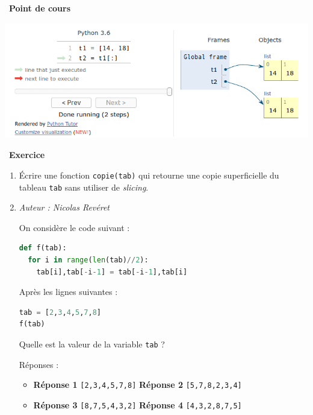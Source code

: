 \documentclass[
  11pt,
]{article}
\newcommand{\passthrough}[1]{#1}
\providecommand{\tightlist}{%
  \setlength{\itemsep}{0pt}\setlength{\parskip}{0pt}}
\newcounter{exo}
\newenvironment{exercice}[1]
{\par \medskip   \addtocounter{exo}{1} \noindent  
\begin{bclogo}[arrondi =0.1,   noborder = true, logo=\bccrayon, marge=4]{~\textbf{Exercice} \textbf{\theexo} {\itshape #1} }  \par}
{
\end{bclogo}
 \par \bigskip }
\newcounter{def}
\newcounter{cours}
\newenvironment{cours}[1]
{\par \medskip   \addtocounter{cours}{1} \noindent  
\begin{bclogo}[arrondi =0.1,  ombre = true, barre=none, logo=\bcbook, marge=4]{~\textbf{Point de cours} \textbf{\thecours} {\itshape #1} }  \par}
{
\end{bclogo}
 \par \bigskip }
\begin{document}
\begin{cours}{}
\begin{itemize}
  \includegraphics{images/shallow-copy.png}\\
\end{itemize}

\end{cours}

\begin{exercice}{}

\begin{enumerate}
\def\labelenumi{\arabic{enumi}.}
\item
  Écrire une fonction \passthrough{\lstinline!copie(tab)!} qui retourne
  une copie superficielle du tableau \passthrough{\lstinline!tab!} sans
  utiliser de \emph{slicing}.
\item
  \emph{Auteur : Nicolas Revéret}

  On considère le code suivant :

\begin{lstlisting}[language=Python]
def f(tab):
  for i in range(len(tab)//2):
    tab[i],tab[-i-1] = tab[-i-1],tab[i]
\end{lstlisting}

  Après les lignes suivantes :

\begin{lstlisting}[language=Python]
tab = [2,3,4,5,7,8]
f(tab)
\end{lstlisting}

  Quelle est la valeur de la variable \passthrough{\lstinline!tab!} ?

  Réponses :

  \begin{itemize}
  \tightlist
  \item
    \textbf{Réponse 1} \passthrough{\lstinline![2,3,4,5,7,8]!}
    \textbf{Réponse 2} \passthrough{\lstinline![5,7,8,2,3,4]!}
  \item
    \textbf{Réponse 3} \passthrough{\lstinline![8,7,5,4,3,2]!}
    \textbf{Réponse 4} \passthrough{\lstinline![4,3,2,8,7,5]!}
  \end{itemize}
\end{enumerate}

\end{exercice}
\end{document}
